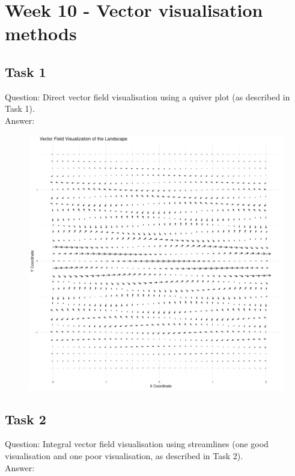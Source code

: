 \documentclass[12pt,a4paper]{report}
\begin{document}
\section{Week 10 - Vector visualisation methods}
\subsection{Task 1}
Question: Direct vector field visualisation using a quiver plot (as described in Task 1).
\\
Answer: 

\begin{figure}[H]
\centering
\includegraphics[width=\textwidth]{../Code/week 10/task1VectorField.png} 
\end{figure}



\subsection{Task 2}
Question: Integral vector field visualisation using streamlines (one good visualisation and one poor visualisation, as
described in Task 2).
\\
Answer: 
\end{document}
